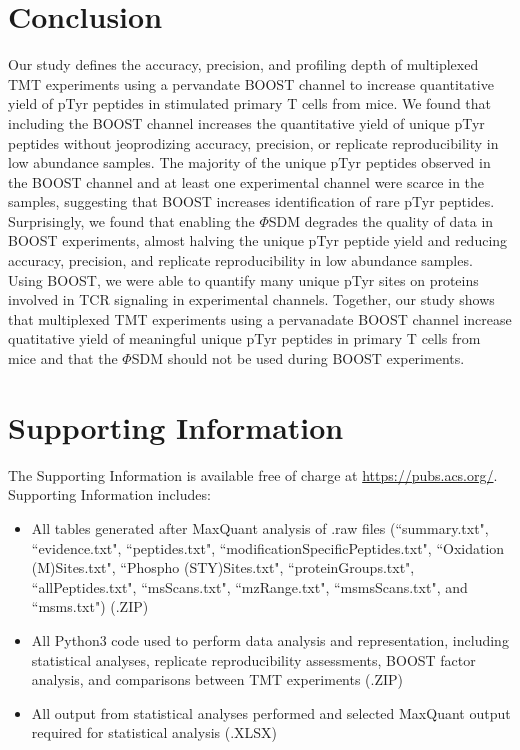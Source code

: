 \documentclass[journal=jprobs,manuscript=article]{achemso}
\begin{document}
\section{Conclusion}

Our study defines the accuracy, precision, and profiling depth of multiplexed TMT experiments using a pervandate BOOST channel to increase quantitative yield of pTyr peptides in stimulated primary T cells from mice. We found that including the BOOST channel increases the quantitative yield of unique pTyr peptides without jeoprodizing accuracy, precision, or replicate reproducibility in low abundance samples. The majority of the unique pTyr peptides observed in the BOOST channel and at least one experimental channel were scarce in the samples, suggesting that BOOST increases identification of rare pTyr peptides. Surprisingly, we found that enabling the $\Phi$SDM degrades the quality of data in BOOST experiments, almost halving the unique pTyr peptide yield and reducing accuracy, precision, and replicate reproducibility in low abundance samples. Using BOOST, we were able to quantify many unique pTyr sites on proteins involved in TCR signaling in experimental channels. Together, our study shows that multiplexed TMT experiments using a pervanadate BOOST channel increase quatitative yield of meaningful unique pTyr peptides in primary T cells from mice and that the $\Phi$SDM should not be used during BOOST experiments.

\section{Supporting Information}

The Supporting Information is available free of charge at \href{https://pubs.acs.org/}{https://pubs.acs.org/}. Supporting Information includes:

\begin{itemize}
    \item {All tables generated after MaxQuant analysis of .raw files (``summary.txt", ``evidence.txt", ``peptides.txt", ``modificationSpecificPeptides.txt", ``Oxidation (M)Sites.txt", ``Phospho (STY)Sites.txt", ``proteinGroups.txt", ``allPeptides.txt", ``msScans.txt", ``mzRange.txt", ``msmsScans.txt",  and ``msms.txt") (.ZIP)}
    \item {All Python3 code used to perform data analysis and representation, including statistical analyses, replicate reproducibility assessments, BOOST factor analysis, and comparisons between TMT experiments (.ZIP)}
    \item {All output from statistical analyses performed and selected MaxQuant output required for statistical analysis (.XLSX)}
\end{itemize}
\end{document}
